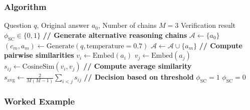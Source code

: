 \documentclass[12pt,a4paper]{article}
\theoremstyle{definition}
\begin{document}
\subsubsection{Algorithm}

\begin{algorithm}[htbp]
\caption{Self-Consistency Verification}
\begin{algorithmic}[1]
\Require Question $q$, Original answer $a_0$, Number of chains $M=3$
\Ensure Verification result $\phi_{\text{SC}} \in \{0, 1\}$
\State
\State \textbf{// Generate alternative reasoning chains}
\State $\mathcal{A} \gets \{a_0\}$ 
    \State $(c_m, a_m) \gets \text{Generate}(q, \text{temperature}=0.7)$ 
    \State $\mathcal{A} \gets \mathcal{A} \cup \{a_m\}$
\EndFor
\State
\State \textbf{// Compute pairwise similarities}
    \State $v_i \gets \text{Embed}(a_i)$ 
    \State $v_j \gets \text{Embed}(a_j)$
    \State $s_{ij} \gets \text{CosineSim}(v_i, v_j)$
\EndFor
\State
\State \textbf{// Compute average similarity}
\State $s_{\text{avg}} \gets \frac{2}{M(M-1)} \sum_{i<j} s_{ij}$
\State
\State \textbf{// Decision based on threshold}
 
    \State \Return $\phi_{\text{SC}} = 1$ 
\Else
    \State \Return $\phi_{\text{SC}} = 0$ 
\EndIf
\end{algorithmic}
\end{algorithm}

\subsubsection{Worked Example}
\end{document}
